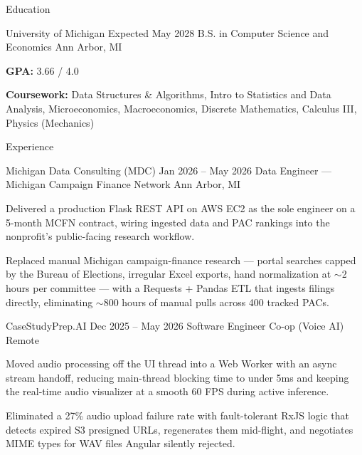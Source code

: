 \documentclass[
	11pt
]{../../../template}
\begin{document}
	\begin{rSection}{E}{ducation}
		\begin{rSectionEntry}
			{University of Michigan}
			{Expected May 2028}
			{B.S. in Computer Science and Economics}
			{}
			{Ann Arbor, MI}

			\item \textbf{GPA:} 3.66 / 4.0
			\item \textbf{Coursework:} Data Structures \& Algorithms, Intro to Statistics and Data Analysis, Microeconomics, Macroeconomics, Discrete Mathematics, Calculus III, Physics (Mechanics)
		\end{rSectionEntry}
	\end{rSection}

	\begin{rSection}{E}{xperience}
		\begin{rSectionEntry}
			{Michigan Data Consulting (MDC)}
			{Jan 2026 -- May 2026}
			{Data Engineer --- Michigan Campaign Finance Network}
			{}
			{Ann Arbor, MI}

			\item Delivered a production Flask REST API on AWS EC2 as the sole engineer on a 5-month MCFN contract, wiring ingested data and PAC rankings into the nonprofit's public-facing research workflow.
			\item Replaced manual Michigan campaign-finance research --- portal searches capped by the Bureau of Elections, irregular Excel exports, hand normalization at $\sim$2 hours per committee --- with a Requests + Pandas ETL that ingests filings directly, eliminating $\sim$800 hours of manual pulls across 400 tracked PACs.
		\end{rSectionEntry}

		\begin{rSectionEntry}
			{CaseStudyPrep.AI}
			{Dec 2025 -- May 2026}
			{Software Engineer Co-op (Voice AI)}
			{}
			{Remote}

			\item Moved audio processing off the UI thread into a Web Worker with an async stream handoff, reducing main-thread blocking time to under 5ms and keeping the real-time audio visualizer at a smooth 60 FPS during active inference.
			\item Eliminated a 27\% audio upload failure rate with fault-tolerant RxJS logic that detects expired S3 presigned URLs, regenerates them mid-flight, and negotiates MIME types for WAV files Angular silently rejected.
		\end{rSectionEntry}

	\end{rSection}
\end{document}
